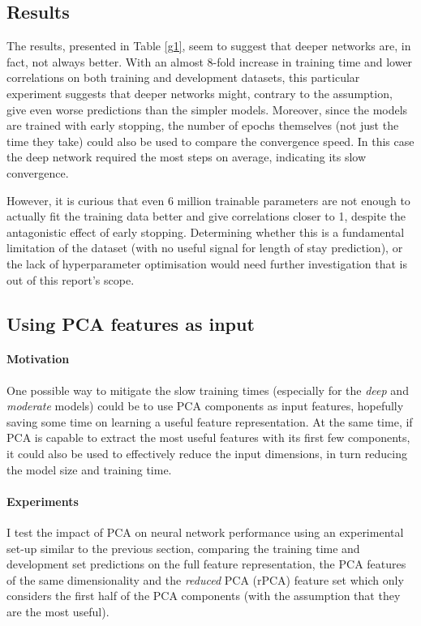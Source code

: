 \documentclass[10pt, twocolumn]{article}
\begin{document}
\subsection{Results}
The results, presented in Table \ref{g1}, seem to suggest that deeper networks are, in fact, not always better. With an almost 8-fold increase in training time and lower correlations on both training and development datasets, this particular experiment suggests that deeper networks might, contrary to the assumption, give even worse predictions than the simpler models. Moreover, since the models are trained with early stopping, the number of epochs themselves (not just the time they take) could also be used to compare the convergence speed. In this case the deep network required the most steps on average, indicating its slow convergence.

However, it is curious that even 6 million trainable parameters are not enough to actually fit the training data better and give correlations closer to 1, despite the antagonistic effect of early stopping. Determining whether this is a fundamental limitation of the dataset (with no useful signal for length of stay prediction), or the lack of hyperparameter optimisation would need further investigation that is out of this report's scope.

\subsection{Using PCA features as input}
\paragraph{Motivation} One possible way to mitigate the slow training times (especially for the \textit{deep} and \textit{moderate} models) could be to use PCA components as input features, hopefully saving some time on learning a useful feature representation. At the same time, if PCA is capable to extract the most useful features with its first few components, it could also be used to effectively reduce the input dimensions, in turn reducing the model size and training time. 

\paragraph{Experiments} I test the impact of PCA on neural network performance using an experimental set-up similar to the previous section, comparing the training time and development set predictions on the full feature representation, the PCA features of the same dimensionality and the \textit{reduced} PCA (rPCA) feature set which only considers the first half of the PCA components (with the assumption that they are the most useful).
\end{document}
